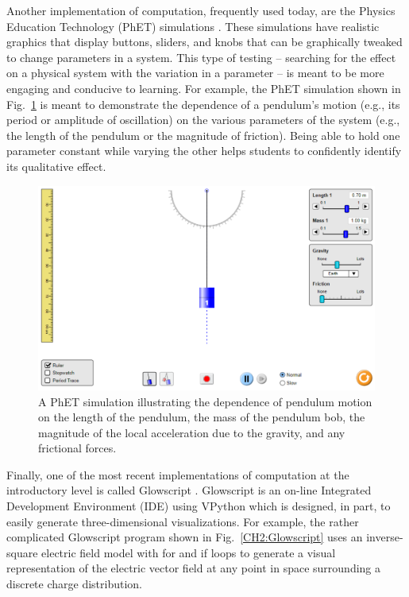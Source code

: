 \documentclass{msuphddissertation}
\begin{document}
\begin{doublespace}
Another implementation of computation, frequently used today, are the Physics Education Technology (PhET) simulations \cite{Perkins2006}.  These simulations have realistic graphics that display buttons, sliders, and knobs that can be graphically tweaked to change parameters in a system.  This type of testing -- searching for the effect on a physical system with the variation in a parameter -- is meant to be more engaging and conducive to learning.  For example, the PhET simulation shown in Fig.~\ref{CH2:PhET} is meant to demonstrate the dependence of a pendulum's motion (e.g., its period or amplitude of oscillation) on the various parameters of the system (e.g., the length of the pendulum or the magnitude of friction).  Being able to hold one parameter constant while varying the other helps students to confidently identify its qualitative effect.

\begin{figure}\center
\includegraphics[scale=0.50]{images/CH2PhET.pdf}
\caption{A PhET simulation illustrating the dependence of pendulum motion on the length of the pendulum, the mass of the pendulum bob, the magnitude of the local acceleration due to the gravity, and any frictional forces.}\label{CH2:PhET}
\end{figure}

Finally, one of the most recent implementations of computation at the introductory level is called Glowscript \cite{Chabay2008}.  Glowscript is an on-line Integrated Development Environment (IDE) using VPython which is designed, in part, to easily generate three-dimensional visualizations.  For example, the rather complicated Glowscript program shown in Fig.~\ref{CH2:Glowscript} uses an inverse-square electric field model with for and if loops to generate a visual representation of the electric vector field at any point in space surrounding a discrete charge distribution. 


\end{doublespace}
\end{document}
